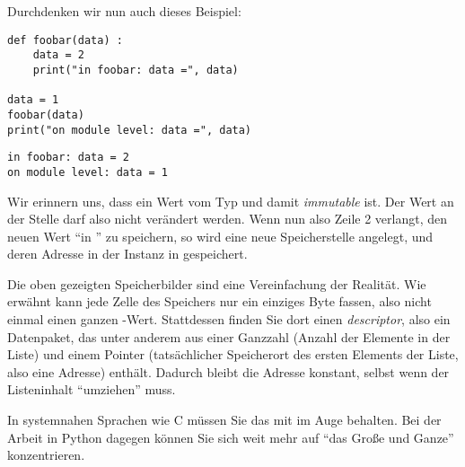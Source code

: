 \begin{tcolorbox}[title=Speicherbild]
\begin{center}
\end{center}
\end{tcolorbox}


Durchdenken wir nun auch dieses Beispiel:
\begin{codebox}
\begin{verbatim}
def foobar(data) :
    data = 2
    print("in foobar: data =", data)

data = 1
foobar(data)
print("on module level: data =", data)
\end{verbatim}
\end{codebox}

\begin{cmdbox}
\begin{verbatim}
in foobar: data = 2
on module level: data = 1
\end{verbatim}
\end{cmdbox}

Wir erinnern uns, dass  ein Wert vom Typ  und damit \emph{immutable} ist. Der Wert an der Stelle  darf also nicht verändert werden. Wenn nun also Zeile 2 verlangt, den neuen Wert  \enquote{in } zu speichern, so wird eine neue Speicherstelle angelegt, und deren Adresse in der Instanz  in  gespeichert.

\begin{hintbox}
Die oben gezeigten Speicherbilder sind eine Vereinfachung der Realität. Wie erwähnt kann jede Zelle des Speichers nur ein einziges Byte fassen, also nicht einmal einen ganzen -Wert. Stattdessen finden Sie dort einen \emph{descriptor}, also ein Datenpaket, das unter anderem aus einer Ganzzahl (Anzahl der Elemente in der Liste) und einem Pointer (tatsächlicher Speicherort des ersten Elements der Liste, also eine Adresse) enthält. Dadurch bleibt die Adresse  konstant, selbst wenn der Listeninhalt \enquote{umziehen} muss.

In systemnahen Sprachen wie C müssen Sie das mit im Auge behalten. Bei der Arbeit in Python dagegen können Sie sich weit mehr auf \enquote{das Große und Ganze} konzentrieren.
\end{hintbox}

